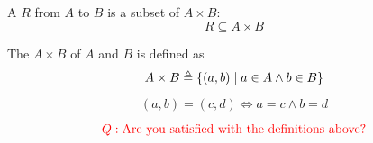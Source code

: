 
\begin{frame}{}
\end{frame}

% 

\begin{frame}{}
  \begin{columns}
  \end{columns}
\end{frame}

\begin{frame}{}
  \begin{columns}
      \pause
  \end{columns}
\end{frame}

\begin{frame}{}
  \begin{definition}[Relations]
    A  $R$ from $A$ to $B$ is a subset of $A \times B$:
    \[
      {R \subseteq A \times B}
    \]
  \end{definition}

  \pause
  \vspace{0.30cm}
  \begin{definition}
    The  $A \times B$ of $A$ and $B$ is defined as 
    \[
      {A \times B \triangleq \{(a, b) \mid a \in A \land b \in B\}}
    \]
  \end{definition}

  \pause
  \vspace{0.30cm}
  \begin{theorem}
    \[
      (a, b) = (c, d) \iff a = c \land b = d
    \]
  \end{theorem}

  \pause
  \[
    \textcolor{red}{Q: \text{Are you satisfied with the definitions above?}}
  \]
\end{frame}
